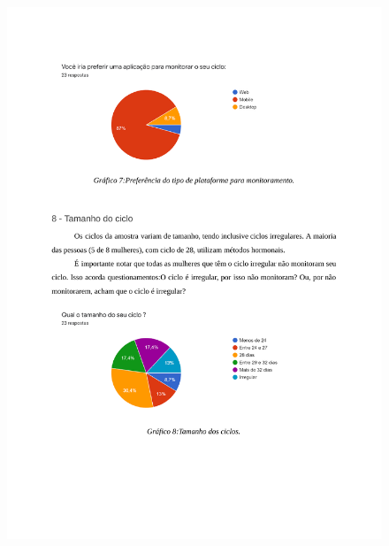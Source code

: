 \begin{apendicesenv}
    \begin{figure}[h]
        \centering
        \includegraphics[keepaspectratio=true,scale=0.7]{figuras/Tab6.pdf}
    \end{figure}
    

\end{apendicesenv}
